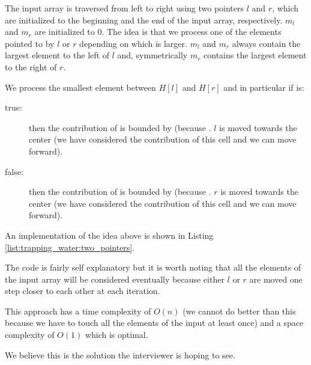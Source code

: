 The input array is traversed from left to right using two pointers $l$ and $r$, which are initialized to the beginning and the end of the input array, respectively.
$m_l$ and $m_r$ are initialized to $0$.
The idea is that we process one of the elements pointed to by $l$ or $r$ depending on which is larger. 
$m_l$ and $m_r$ always contain the largest element to the left of $l$ and, symmetrically $m_r$ contains the largest element to the right of $r$. 

We process the smallest element between $H[l]$ and $H[r]$ and in particular if  is:
\begin{description}
	\item[true:]  then the contribution of  is bounded by  (because . $l$ is moved towards the center (we have considered the contribution of this cell and we can move forward).\\
	\item[false:] then the contribution of  is bounded by  (because . $r$ is moved towards the center (we have considered the contribution of this cell and we can move forward). \\
\end{description}

An implementation of the idea above is shown in Listing \ref{list:trapping_water:two_pointers}.



The code is fairly self explanatory but it is worth noting that all the elements of the input array will be  considered eventually because either $l$ or $r$ are moved one step closer to each other at each iteration. 

This approach has a time complexity of $O(n)$ (we cannot do better than this because we have to touch all the elements of the input at least once) and a space complexity of $O(1)$ which is optimal.

We believe this is the solution the interviewer is hoping to see. 



